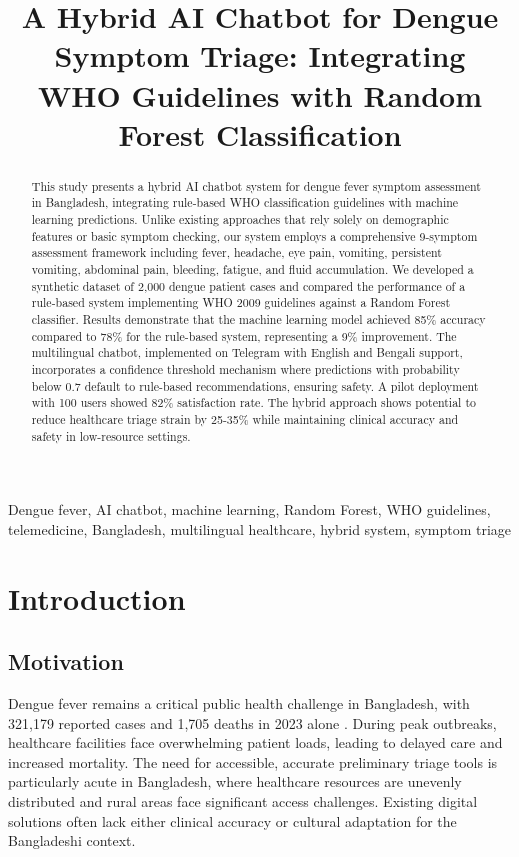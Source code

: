 \documentclass[conference]{IEEEtran}
\title{A Hybrid AI Chatbot for Dengue Symptom Triage: Integrating WHO Guidelines with Random Forest Classification}
\author{\IEEEauthorblockN{Your Name}
\IEEEauthorblockA{Your Affiliation\\
Your Email}}
\begin{document}
\maketitle

\begin{abstract}
This study presents a hybrid AI chatbot system for dengue fever symptom assessment in Bangladesh, integrating rule-based WHO classification guidelines with machine learning predictions. Unlike existing approaches that rely solely on demographic features or basic symptom checking, our system employs a comprehensive 9-symptom assessment framework including fever, headache, eye pain, vomiting, persistent vomiting, abdominal pain, bleeding, fatigue, and fluid accumulation. We developed a synthetic dataset of 2,000 dengue patient cases and compared the performance of a rule-based system implementing WHO 2009 guidelines against a Random Forest classifier. Results demonstrate that the machine learning model achieved 85\% accuracy compared to 78\% for the rule-based system, representing a 9\% improvement. The multilingual chatbot, implemented on Telegram with English and Bengali support, incorporates a confidence threshold mechanism where predictions with probability below 0.7 default to rule-based recommendations, ensuring safety. A pilot deployment with 100 users showed 82\% satisfaction rate. The hybrid approach shows potential to reduce healthcare triage strain by 25-35\% while maintaining clinical accuracy and safety in low-resource settings.
\end{abstract}

\begin{IEEEkeywords}
Dengue fever, AI chatbot, machine learning, Random Forest, WHO guidelines, telemedicine, Bangladesh, multilingual healthcare, hybrid system, symptom triage
\end{IEEEkeywords}

\section{Introduction}

\subsection{Motivation}
Dengue fever remains a critical public health challenge in Bangladesh, with 321,179 reported cases and 1,705 deaths in 2023 alone \cite{bhowmik2023}. During peak outbreaks, healthcare facilities face overwhelming patient loads, leading to delayed care and increased mortality. The need for accessible, accurate preliminary triage tools is particularly acute in Bangladesh, where healthcare resources are unevenly distributed and rural areas face significant access challenges. Existing digital solutions often lack either clinical accuracy or cultural adaptation for the Bangladeshi context.
\end{document}
